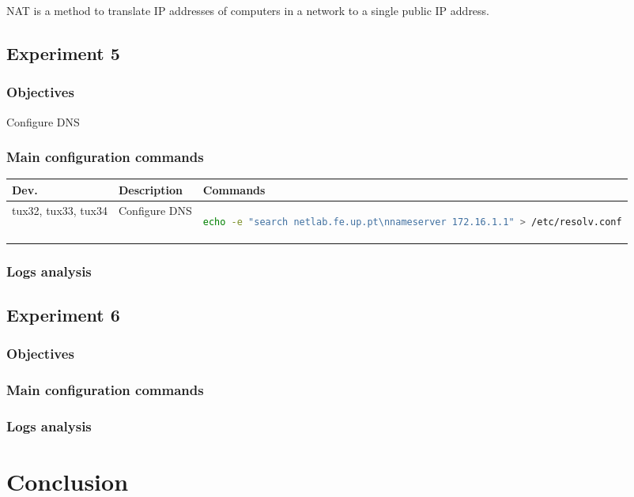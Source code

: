 \documentclass[a4paper, 11pt]{report}
\begin{document}
NAT is a method to translate IP addresses of computers in a network to a single public IP address.

\subsection{Experiment 5} \label{sec:Exp5}
\subsubsection{Objectives} \label{sec:Obj5}
Configure DNS
\subsubsection{Main configuration commands} \label{sec:Com5}
\begin{tabular}{p{11mm} | p{26mm} | p{112mm}}
    \textbf{Dev.} & \textbf{Description}                                  & \textbf{Commands}                       \\ \hline
    tux32, tux33, tux34      & Configure DNS & 
    \begin{lstlisting}[frame=none, numbers=none, language=sh, aboveskip=-0.5 \baselineskip, belowskip=-0.8 \baselineskip]
echo -e "search netlab.fe.up.pt\nnameserver 172.16.1.1" > /etc/resolv.conf
    \end{lstlisting}
\end{tabular}
\subsubsection{Logs analysis} \label{sec:Log5}

\subsection{Experiment 6} \label{sec:Exp6}
\subsubsection{Objectives} \label{sec:Obj6}
\subsubsection{Main configuration commands} \label{sec:Com6}
\subsubsection{Logs analysis} \label{sec:Log6}

\section*{Conclusion} \label{sec:Conclusion}
\end{document}
